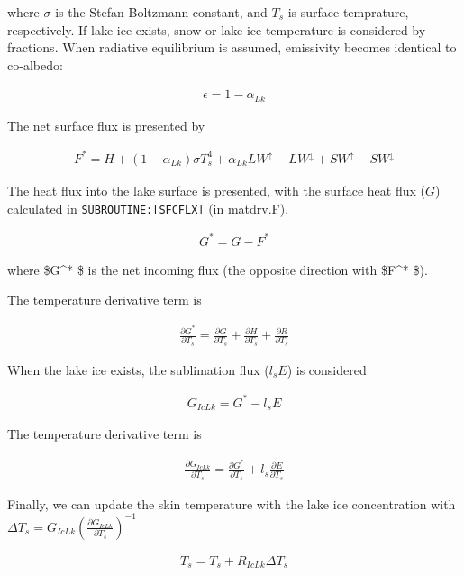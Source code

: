 where \(\sigma\) is the Stefan-Boltzmann constant, and \(T_s\) is
surface temprature, respectively. If lake ice exists, snow or lake ice
temperature is considered by fractions. When radiative equilibrium is
assumed, emissivity becomes identical to co-albedo:

\begin{eqnarray}
    \epsilon = 1 - \alpha_{Lk}
\end{eqnarray}

The net surface flux is presented by

\begin{eqnarray}
    F^*=H + (1-\alpha_{Lk})\sigma T_s^4 + \alpha_{Lk} LW^\uparrow - LW^\downarrow +SW^\uparrow - SW^\downarrow      
\end{eqnarray}

The heat flux into the lake surface is presented, with the surface heat
flux (\(G\)) calculated in \texttt{SUBROUTINE:{[}SFCFLX{]}} (in
matdrv.F).

\begin{eqnarray}
    G^* = G - F^*
\end{eqnarray}

where \$G\^{}* \$ is the net incoming flux (the opposite direction with
\$F\^{}* \$).

The temperature derivative term is

\begin{eqnarray}
    \frac{\partial G^*}{\partial T_s} = \frac{\partial G}{\partial T_s}+\frac{\partial H}{\partial T_s}+\frac{\partial R}{\partial T_s}
\end{eqnarray}

When the lake ice exists, the sublimation flux (\(l_sE\)) is considered

\begin{eqnarray}
    G_{IcLk} = G^* - l_s E
\end{eqnarray}

The temperature derivative term is

\begin{eqnarray}
    \frac{\partial G_{IcLk}}{\partial T_s}=\frac{\partial G^*}{\partial T_s} + l_s\frac{\partial E}{\partial T_s}
\end{eqnarray}

Finally, we can update the skin temperature with the lake ice
concentration with
\(\Delta T_s=G_{IcLk} ( \frac{\partial G_{IcLk}}{\partial T_s})^{-1}\)

\begin{eqnarray}
    T_s = T_s +R_{IcLk} \Delta T_s
\end{eqnarray}

